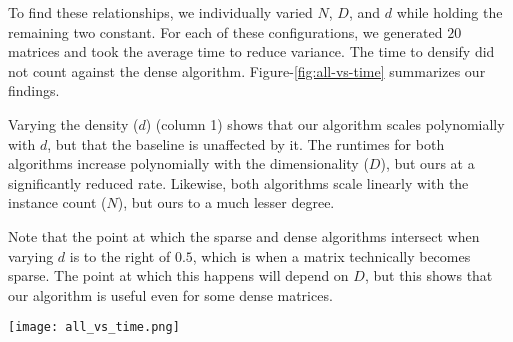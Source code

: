 \documentclass{article}
\begin{document}
To find these relationships, we individually varied $N$, $D$, and $d$ while holding the remaining two constant.
For each of these configurations, we generated $20$ matrices and took the average time to reduce variance.
The time to densify did not count against the dense algorithm.
Figure-\ref{fig:all-vs-time} summarizes our findings.

Varying the density ($d$) (column 1) shows that our algorithm scales polynomially with $d$, but that the baseline is unaffected by it.
The runtimes for both algorithms increase polynomially with the dimensionality ($D$), but ours at a significantly reduced rate.
Likewise, both algorithms scale linearly with the instance count ($N$), but ours to a much lesser degree.

Note that the point at which the sparse and dense algorithms intersect when varying $d$ is to the right of $0.5$, which is when a matrix technically becomes sparse.
The point at which this happens will depend on $D$, but this shows that our algorithm is useful even for some dense matrices.

\begin{figure*}[ht!]
\vskip 0.2in
\begin{center}
\centerline{\texttt{[image: all\_vs\_time.png]}}
\caption{
Summary performance comparison plots for quadratic (top) and cubic (bottom) cases showing how the algorithm's performance varies with $d$, $D$, and $N$; our sparse algorithm is shown in blue, the dense algorithm in red. Each point in each graph is an average of 20 runs, and the time used in densification is not included in the dense-algorithm timings. In the quadratic case, sparsity loses its advantage at about 67\%, and at about 77\% for the cubic case, though these precise intersections depend on $D$. In general, taking advantage of sparsity shows large benefits, so large that it's difficult to see that the performance does not actually change linearly with $D$ (column 2); figure \ref{fig:sparse_D_and_N_vs_time} gives further details.}
\label{fig:all-vs-time}
\end{center}
\vskip -0.2in
\end{figure*}
\end{document}
